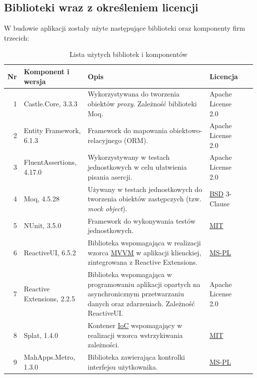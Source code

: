 \documentclass[10pt,a4paper]{article}
\begin{document}
\subsection{Biblioteki wraz z określeniem licencji}
W budowie aplikacji zostały użyte następujące biblioteki oraz komponenty firm trzecich:

\begin{table}[H]
	\begin{tabularx}{\textwidth}{|r|l|X|l|c|}
		\hline
		\textbf{Nr} & \textbf{Komponent i wersja} & \textbf{Opis} & \textbf{Licencja} & \\
		\hline
		1 & 
		Castle.Core, 3.3.3 &
		Wykorzystywana do tworzenia obiektów \textit{proxy}. Zależność biblioteki Moq. &
		Apache License 2.0 &
		\cite{castlecore} \\
		\hline
		2 &
		Entity Framework, 6.1.3 &
		Framework do mapowania obiektowo-relacyjnego (ORM). &
		Apache License 2.0 &
		\cite{entityframework} \\
		\hline
		3 &
		FluentAssertions, 4.17.0 &
		Wykorzystywany w testach jednostkowych w celu ułatwienia pisania asercji. &
		Apache License 2.0 &
		\cite{fluentassertions} \\
		\hline
		4 &
		Moq, 4.5.28 &
		Używany w testach jednostkowych do tworzenia obiektów zastępczych (tzw. \emph{mock object}). &
		\mbox{\hyperref[abbr:bsd]{BSD}} 3-Clause &
		\cite{moq} \\
		\hline
		5 &
		NUnit, 3.5.0 &
		Framework do wykonywania testów jednostkowych. &
		\mbox{\hyperref[abbr:mit]{MIT}} &
		\cite{nunit} \\
		\hline
		6 &
		ReactiveUI, 6.5.2 &
		Biblioteka wspomagająca w realizacji wzorca \hyperref[abbr:mvvm]{MVVM} w aplikacji klienckiej, zintegrowana z Reactive Extensions. &
		\mbox{\hyperref[abbr:mspl]{MS-PL}} &
		\cite{reactiveui} \\
		\hline
		7 &
		Reactive Extensions, 2.2.5 &
		Biblioteka wspomagająca w programowaniu aplikacji opartych na asynchronicznym przetwarzaniu danych oraz zdarzeniach. Zależność ReactiveUI. &
		Apache License 2.0 &
		\cite{reactiveextensions} \\
		\hline
		8 &
		Splat, 1.4.0 &
		Kontener \hyperref[abbr:ioc]{IoC} wspomagający w realizacji wzorca wstrzykiwania zależności. &
		\mbox{\hyperref[abbr:mit]{MIT}} &
		\cite{splat} \\
		\hline
		9 &
		MahApps.Metro, 1.3.0 &
		Biblioteka zawierająca kontrolki interfejsu użytkownika. &
		\mbox{\hyperref[abbr:mspl]{MS-PL}} &
		\cite{mahapps} \\
		\hline
	\end{tabularx}
	\caption{Lista użytych bibliotek i komponentów}
\end{table}
\end{document}
